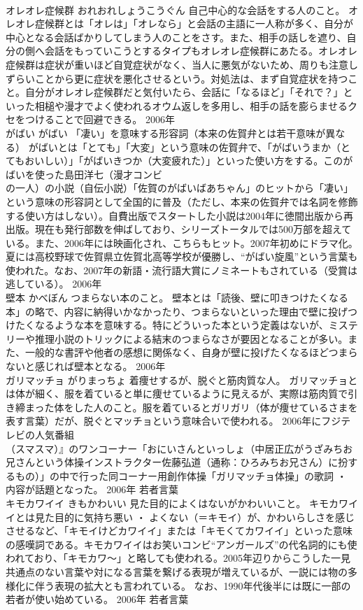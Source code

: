 \documentclass[8pt]{extreport}
\begin{document}
\begin{CJK}{UTF8}{min}
\\	オレオレ症候群	おれおれしょうこうぐん	自己中心的な会話をする人のこと。	オレオレ症候群とは「オレは」「オレなら」と会話の主語に一人称が多く、自分が中心となる会話ばかりしてしまう人のことをさす。また、相手の話しを遮り、自分の側へ会話をもっていこうとするタイプもオレオレ症候群にあたる。オレオレ症候群は症状が重いほど自覚症状がなく、当人に悪気がないため、周りも注意しずらいことから更に症状を悪化させるという。対処法は、まず自覚症状を持つこと。自分がオレオレ症候群だと気付いたら、会話に「なるほど」「それで？」といった相槌や漫才でよく使われるオウム返しを多用し、相手の話を膨らませるクセをつけることで回避できる。	2006年	
\\	がばい	がばい	「凄い」を意味する形容詞（本来の佐賀弁とは若干意味が異なる）	がばいとは「とても」「大変」という意味の佐賀弁で、「がばいうまか（とてもおいしい）」「がばいきつか（大変疲れた）」といった使い方をする。このがばいを使った島田洋七（漫才コンビ
\\	の一人）の小説（自伝小説）「佐賀のがばいばあちゃん」のヒットから「凄い」という意味の形容詞として全国的に普及（ただし、本来の佐賀弁では名詞を修飾する使い方はしない）。自費出版でスタートした小説は2004年に徳間出版から再出版。現在も発行部数を伸ばしており、シリーズトータルでは500万部を超えている。また、2006年には映画化され、こちらもヒット。2007年初めにドラマ化。夏には高校野球で佐賀県立佐賀北高等学校が優勝し、“がばい旋風”という言葉も使われた。なお、2007年の新語・流行語大賞にノミネートもされている（受賞は逃している）。	2006年	
\\	壁本	かべぼん	つまらない本のこと。	壁本とは「読後、壁に叩きつけたくなる本」の略で、内容に納得いかなかったり、つまらないといった理由で壁に投げつけたくなるような本を意味する。特にどういった本という定義はないが、ミステリーや推理小説のトリックによる結末のつまらなさが要因となることが多い。また、一般的な書評や他者の感想に関係なく、自身が壁に投げたくなるほどつまらないと感じれば壁本となる。	2006年	
\\	ガリマッチョ	がりまっちょ	着痩せするが、脱ぐと筋肉質な人。	ガリマッチョとは体が細く、服を着ていると単に痩せているように見えるが、実際は筋肉質で引き締まった体をした人のこと。服を着ているとガリガリ（体が痩せているさまを表す言葉）だが、脱ぐとマッチョという意味合いで使われる。 2006年にフジテレビの人気番組
\\	（スマスマ）』のワンコーナー「おにいさんといっしょ（中居正広がうざみちお兄さんという体操インストラクター佐藤弘道（通称：ひろみちお兄さん）に扮するもの）」の中で行った同コーナー用創作体操「ガリマッチョ体操」の歌詞 ・ 内容が話題となった。	2006年	若者言葉	
\\	キモカワイイ	きもかわいい	見た目的によくはないがかわいいこと。	キモカワイイとは見た目的に気持ち悪い ・ よくない（＝キモイ）が、かわいらしさを感じさせるなど、「キモイけどカワイイ」または「キモくてカワイイ」といった意味の感嘆詞である。キモカワイイはお笑いコンビ“アンガールズ”の代名詞的にも使われており、「キモカワ～」と略しても使われる。2005年辺りからこうした一見共通点のない言葉や対になる言葉を繋げる表現が増えているが、一説には物の多様化に伴う表現の拡大とも言われている。 なお、1990年代後半には既に一部の若者が使い始めている。	2006年	若者言葉	

\end{CJK}
\end{document}
